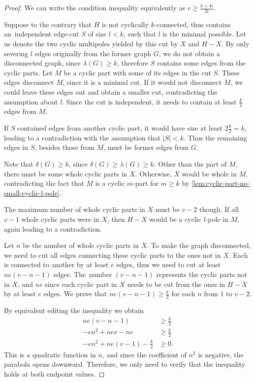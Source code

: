 \documentclass[12pt, twoside]{book}
\begin{document}
\begin{proof}
	We can write the condition inequality equivalently as $v\geq \frac{k+4e}{2e}$.
	
	Suppose to the contrary that $H$ is not cyclically $k$-connected, thus contains an~independent \mbox{edge-cut} $S$ of size $l<k$, such that $l$ is the minimal possible. Let us denote the two cyclic multipoles yielded by this cut by $X$ and $H-X$. By only severing $l$ edges originally from the former graph $G$, we do not obtain a disconnected graph, since $\lambda(G)\geq k$, therefore $S$ contains some edges from the cyclic parts. Let $M$ be a cyclic part with some of its edges in the cut $S$. These edges disconnect $M$, since it is a minimal cut. If it would not disconnect $M$, we could leave these edges out and obtain a smaller cut, contradicting the assumption about $l$. Since the cut is independent, it needs to contain at least $\frac{k}{2}$ edges from $M$.
	
	If $S$ contained edges from another cyclic part, it would have size at least $2\frac{k}{2}=k$, leading to a contradiction with the assumption that $|S|<k$. Thus the remaining edges in $S$, besides those from $M$, must be former edges from $G$.
	
	Note that $\delta(G)\geq k$, since $\delta(G)\geq \lambda(G)\geq k$. Other than the part of $M$, there must be some whole cyclic parts in $X$. Otherwise, $X$ would be whole in $M$, contradicting the fact that $M$ is a cyclic $m$-part for $m\geq k$ by \cref{lem:cyclic-part-no-small-cyclic-l-pole}.
	
	The maximum number of whole cyclic parts in $X$ must be $v-2$ though. If all $v-1$ whole cyclic parts were in $X$, then $H-X$ would be a cyclic $l$-pole in $M$, again leading to a contradiction.
	
	Let $n$ be the number of whole cyclic parts in $X$. To make the graph disconnected, we need to cut all edges connecting these cyclic parts to the ones not in $X$. Each is connected to another by at least $e$ edges, thus we need to cut at least $ne(v-n-1)$ edges. The~number $(v-n-1)$ represents the cyclic parts not in $X$, and $ne$ since each cyclic part in $X$ needs to be cut from the ones in $H-X$ by at least $e$ edges. We prove that $ne(v-n-1)\geq\frac{k}{2}$ for each $n$ from $1$ to $v-2$.
	
	By equivalent editing the inequality we obtain
	\begin{align*}
		ne(v-n-1)&\geq\frac{k}{2} \\
		-en^2+nev-ne&\geq \frac{k}{2} \\
		-en^2+ne(v-1)-\frac{k}{2}&\geq 0.
	\end{align*}
	This is a quadratic function in $n$, and since the coefficient of $n^2$ is negative, the parabola opens downward. Therefore, we only need to verify that the inequality holds at both endpoint values.
	

\end{proof}
\end{document}
